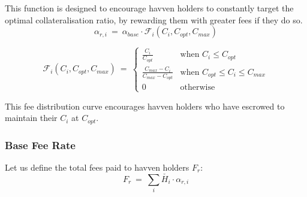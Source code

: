\noindent This function is designed to encourage havven holders to constantly
target the optimal collateralisation ratio, by rewarding them with greater
fees if they do so.\\


\begin{equation}
\alpha_{r,i} \ = \ \alpha_{base} \cdot \mathcal{F}_{i}(C_{i}, C_{opt}, C_{max})  \label{eq:feesreceived}
\end{equation}

\begin{equation}
\mathcal{F}_{i}(C_{i}, C_{opt}, C_{max}) \ = \
\begin{cases}
 \frac{C_{i}}{C_{opt}} &\mbox{when } C_{i} \leq C_{opt} \\[1em]
 \frac{C_{max} - C_{i}}{C_{max} - C_{opt}} &\mbox{when } C_{opt} \leq C_{i} \leq C_{max} \\[1em]
 0 &\mbox{otherwise}
 \end{cases}
 \label{eq:7}
\end{equation}

\begin{center}
\end{center}

\noindent This fee distribution curve encourages havven holders who have escrowed to maintain their $C_i$ at $C_{opt}$.  \\

\newpage

\subsubsection{Base Fee Rate}

Let us define the total fees paid to havven holders $F_{r}$: \\

\begin{equation}
F_{r} \ = \ \sum_{i} \check{H_{i}} \cdot \alpha_{r,i} \label{eq:totalfeesreceived}
\end{equation} \\

